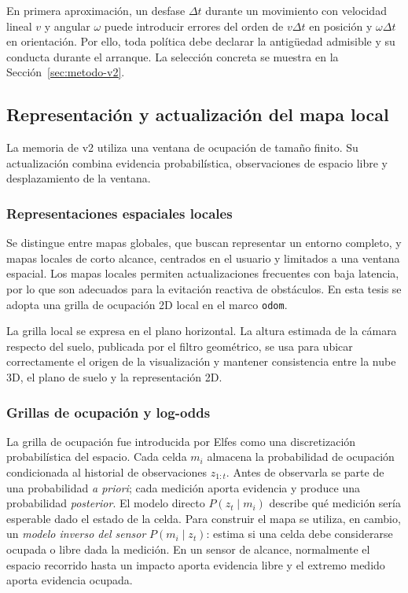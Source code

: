 En primera aproximación, un desfase $\Delta t$ durante un movimiento con velocidad lineal $v$ y
angular $\omega$ puede introducir errores del orden de $v\Delta t$ en posición y
$\omega\Delta t$ en orientación. Por ello, toda política debe declarar la antigüedad admisible y
su conducta durante el arranque. La selección concreta se muestra en la
Sección~\ref{sec:metodo-v2}.

\subsection{Representación y actualización del mapa local}
\label{sec:mt-mapa-local}

La memoria de v2 utiliza una ventana de ocupación de tamaño finito. Su actualización combina
evidencia probabilística, observaciones de espacio libre y desplazamiento de la ventana.

\subsubsection{Representaciones espaciales locales}

Se distingue entre mapas globales, que buscan representar un entorno completo, y mapas locales
de corto alcance, centrados en el usuario y limitados a una ventana espacial. Los mapas locales
permiten actualizaciones frecuentes con baja latencia, por lo que son adecuados para la evitación
reactiva de obstáculos\cite{brock1999high,macenski2020nav2}. En esta tesis se adopta una grilla de
ocupación 2D local en el marco \texttt{odom}.

La grilla local se expresa en el plano horizontal. La altura estimada de la cámara respecto
del suelo, publicada por el filtro geométrico, se usa para ubicar correctamente el origen de
la visualización y mantener consistencia entre la nube 3D, el plano de suelo y la
representación 2D.

\subsubsection{Grillas de ocupación y log-odds}

La grilla de ocupación fue introducida por Elfes \cite{Elfes1989} como una discretización
probabilística del espacio. Cada celda $m_i$ almacena la probabilidad de ocupación
condicionada al historial de observaciones $z_{1:t}$. Antes de observarla se parte de una
probabilidad \emph{a priori}; cada medición aporta evidencia y produce una probabilidad
\emph{posterior}. El modelo directo $P(z_t\mid m_i)$ describe qué medición sería esperable dado
el estado de la celda. Para construir el mapa se utiliza, en cambio, un \emph{modelo inverso del
sensor} $P(m_i\mid z_t)$: estima si una celda debe considerarse ocupada o libre dada la
medición. En un sensor de alcance, normalmente el espacio recorrido hasta un impacto aporta
evidencia libre y el extremo medido aporta evidencia ocupada.

